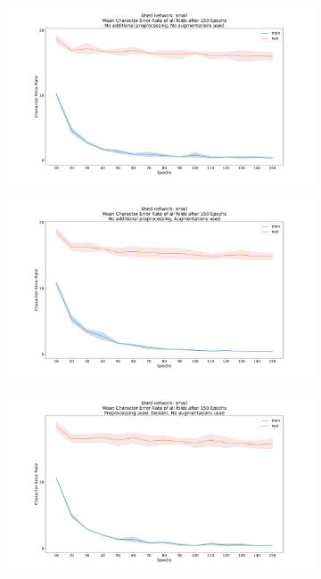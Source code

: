 \documentclass{article}
\begin{document}
\begin{minipage}[!h]{1\linewidth}
\begin{figure}[H]
	\begin{adjustwidth}{-8em}{-8em}
	\centering
    \begin{subfigure}{0.7\textwidth}
        \centering
        \includegraphics[width=\textwidth]{Standard_small_150_cer}
    \end{subfigure}
    \begin{subfigure}{0.7\textwidth}
        \centering
        \includegraphics[width=\textwidth]{Standard_small_150_augmentations_cer}
    \end{subfigure}
    \begin{subfigure}{0.7\textwidth}
        \centering
        \includegraphics[width=\textwidth]{Deslant_small_150_cer}

\end{subfigure}
\end{adjustwidth}
\end{figure}
\end{minipage}
\end{document}
